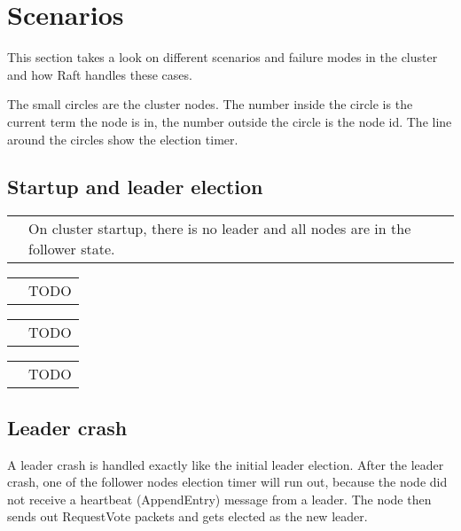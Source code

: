 \section{Scenarios}
This section takes a look on different scenarios and failure modes in the cluster and how Raft handles these cases.

The small circles are the cluster nodes. The number inside the circle is the current term the node is in, the number outside the circle is the node id. The line around the circles show the election timer.

\subsection{Startup and leader election}

\begin{tabularx}{\textwidth}{  p{150px}  X  }
  \noindent\parbox[c]{\hsize}{
  \def\svgwidth{150}
  
  } & On cluster startup, there is no leader and all nodes are in the follower state.
\end{tabularx}

\begin{tabularx}{\textwidth}{  p{150px}  X  }
  \noindent\parbox[c]{\hsize}{
  \def\svgwidth{150}
  
  } & TODO
\end{tabularx}

\begin{tabularx}{\textwidth}{  p{150px}  X  }
  \noindent\parbox[c]{\hsize}{
  \def\svgwidth{150}
  
  } & TODO
\end{tabularx}

\begin{tabularx}{\textwidth}{  p{150px}  X  }
  \noindent\parbox[c]{\hsize}{
  \def\svgwidth{150}
  
  } &TODO
\end{tabularx}



\subsection{Leader crash}
A leader crash is handled exactly like the initial leader election.
After the leader crash, one of the follower nodes election timer will run out, because the node did not receive a heartbeat (AppendEntry) message from a leader. The node then sends out 
RequestVote packets and gets elected as the new leader.

